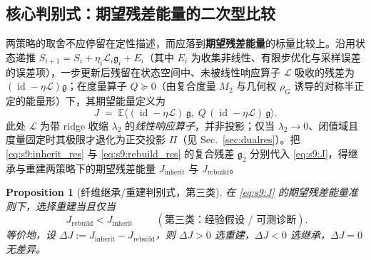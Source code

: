 \documentclass[11pt,a4paper]{article}
\newtheorem{proposition}[theorem]{Proposition}
\DeclareMathOperator{\id}{id}
\newcommand{\E}{\mathbb{E}}
\newcommand{\cL}{\mathcal{L}}   %
\newcommand{\ProjectOp}{\Pi}        %
\newcommand{\gres}{\bm{\mathfrak{g}}} %
\begin{document}
\subsection{核心判别式：期望残差能量的二次型比较}

两策略的取舍不应停留在定性描述，而应落到\textbf{期望残差能量}的标量比较上。沿用状态递推 $S_{i+1}=S_i+\eta_i\cL_i\gres_i+E_i$（其中 $E_i$ 为收集非线性、有限步优化与采样误差的误差项），一步更新后残留在状态空间中、未被线性响应算子 $\cL$ 吸收的残差为 $(\id-\eta\cL)\gres$；在度量算子 $Q\succeq 0$（由复合度量 $M_2$ 与几何权 $\rho_G$ 诱导的对称半正定的能量形）下，其期望能量定义为
\begin{equation}\label{eq:s9:J}
J \;=\; \E\big\langle (\id-\eta\cL)\,\gres,\; Q\,(\id-\eta\cL)\,\gres \big\rangle .
\end{equation}
此处 $\cL$ 为带 ridge 收缩 $\lambda_2$ 的\emph{线性响应算子}，并非投影；仅当 $\lambda_2\to0$、闭值域且度量固定时其极限才退化为正交投影 $\ProjectOp$（见 Sec.~\ref{sec:dualres}）。把 \eqref{eq:s9:inherit_res} 与 \eqref{eq:s9:rebuild_res} 的复合残差 $\gres_2$ 分别代入 \eqref{eq:s9:J}，得继承与重建两策略下的期望残差能量 $J_{\mathrm{inherit}}$ 与 $J_{\mathrm{rebuild}}$。

\begin{proposition}[纤维继承/重建判别式，第三类]\label{prop:s9:discriminant}
在 \eqref{eq:s9:J} 的期望残差能量准则下，选择重建当且仅当
\begin{equation}\label{eq:s9:decision}
\boxed{\;J_{\mathrm{rebuild}}<J_{\mathrm{inherit}}\;}
\qquad(\text{第三类：经验假设 / 可测诊断}).
\end{equation}
等价地，设 $\Delta J:=J_{\mathrm{inherit}}-J_{\mathrm{rebuild}}$，则 $\Delta J>0$ 选重建，$\Delta J<0$ 选继承，$\Delta J=0$ 无差异。
\end{proposition}
\end{document}
